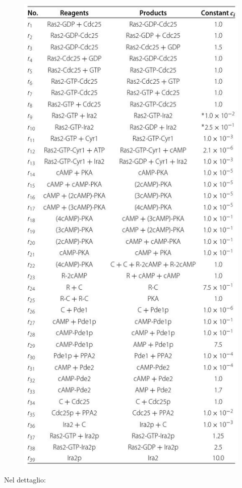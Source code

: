 \documentclass[a4paper,12pt, oneside]{book}
\begin{document}
\begin{figure}[H]
  \centering
  \includegraphics[scale = 0.43]{img/glucoreact.jpg}
\end{figure}
Nel dettaglio:
\end{document}
